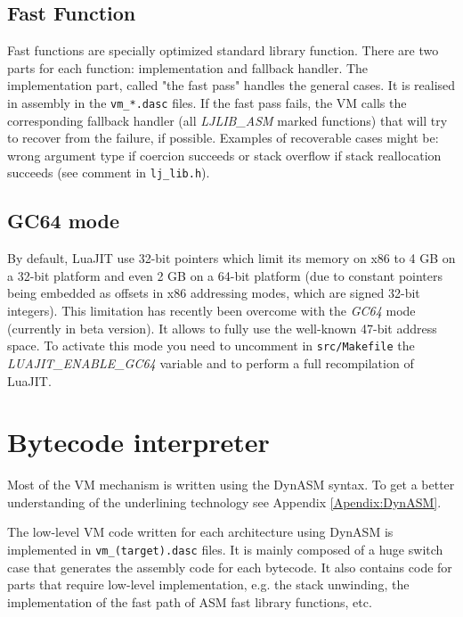 \subsection{Fast Function}
\label{Subsec:ffunc}

Fast functions are specially optimized standard library function. There are two
parts for each function: implementation and fallback handler.
The implementation part, called "the fast pass" handles the general cases. It is realised in assembly in the \texttt{vm\_*.dasc} files. If the fast pass fails, the VM
calls the corresponding fallback handler (all \emph{LJLIB\_ASM} marked functions)
that will try to recover from the failure, if possible. Examples of recoverable
cases might be:  wrong argument type if coercion succeeds or stack overflow
if stack reallocation succeeds (see comment in \texttt{lj\_lib.h}).

\subsection{GC64 mode}
\label{Subsec:gc64}

By default, LuaJIT use 32-bit pointers which limit its memory on x86 to 4 GB on a
32-bit platform and even 2 GB on a 64-bit platform (due to constant pointers being
embedded as offsets in x86 addressing modes, which are signed 32-bit integers).
This limitation has recently been overcome with the \emph{GC64} mode (currently in beta version). It allows to fully use the well-known
47-bit address space. To activate this mode you need to uncomment in
\texttt{src/Makefile} the \textit{LUAJIT\_ENABLE\_GC64} variable and to perform a full
recompilation of LuaJIT.

\section{Bytecode interpreter}
Most of the VM mechanism is written using the DynASM syntax. To get a better
understanding of the underlining technology see Appendix \ref{Apendix:DynASM}.

The low-level VM code written for each architecture using DynASM is implemented in \texttt{vm\_(target).dasc} files. It is mainly composed of a huge switch case that generates the assembly code for each bytecode. It also contains code for parts that require low-level implementation, e.g. the stack unwinding, the implementation of the fast path of ASM fast library functions, etc.

